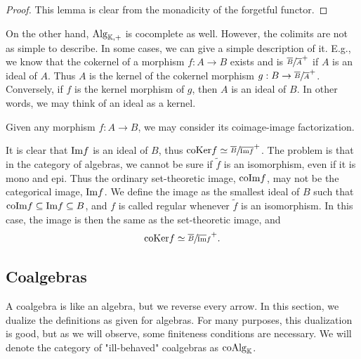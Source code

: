 \documentclass[../thesis.tex]{subfiles}
\begin{document}
                \begin{proof}
                    This lemma is clear from the monadicity of the forgetful functor.
                \end{proof}

                On the other hand, $\tt{Alg}_{\mathbb{K},+}$ is cocomplete as well. However, the colimits are not as simple to describe. In some cases, we can give a simple description of it. E.g., we know that the cokernel of a morphism $f: A \rightarrow B$ exists and is $\sfrac{\overline{B}}{\overline{A}}^+$ if $A$ is an ideal of $A$. Thus $A$ is the kernel of the cokernel morphism $g : B \rightarrow \sfrac{\overline{B}}{\overline{A}}^+$. Conversely, if $f$ is the kernel morphism of $g$, then $A$ is an ideal of $B$. In other words, we may think of an ideal as a kernel.
                
                Given any morphism $f: A \rightarrow B$, we may consider its coimage-image factorization.
                \begin{center}
                \end{center}
                It is clear that $\tt{Im}f$ is an ideal of $B$, thus $\tt{coKer}f \simeq \sfrac{\overline{B}}{\overline{\tt{Im}f}}^+$. The problem is that in the category of algebras, we cannot be sure if $\widetilde{f}$ is an isomorphism, even if it is mono and epi. Thus the ordinary set-theoretic image, $\tt{coIm}f$, may not be the categorical image, $\tt{Im}f$. We define the image as the smallest ideal of $B$ such that $\tt{coIm}f \subseteq \tt{Im}f \subseteq B$, and $f$ is called regular whenever $\widetilde{f}$ is an isomorphism. In this case, the image is then the same as the set-theoretic image, and
                \begin{align*}
                    \tt{coKer}f \simeq \sfrac{\overline{B}}{\overline{\tt{Im}}f}^+\tt{.}
                \end{align*}

    \subsection{Coalgebras}
            A coalgebra is like an algebra, but we reverse every arrow. In this section, we dualize the definitions as given for algebras. For many purposes, this dualization is good, but as we will observe, some finiteness conditions are necessary. We will denote the category of "ill-behaved" coalgebras as $\tt{coAlg}_\mathbb{K}$.
\end{document}
